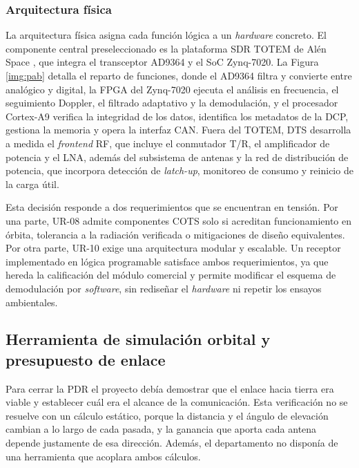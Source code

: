 
\subsubsection{Arquitectura física}

La arquitectura física asigna cada función lógica a un \textit{hardware} concreto. El componente central preseleccionado es la plataforma SDR TOTEM de Alén Space \parencite{alenspace}, que integra el transceptor AD9364 y el SoC Zynq-7020. La Figura \ref{img:pab} detalla el reparto de funciones, donde el AD9364 filtra y convierte entre analógico y digital, la FPGA del Zynq-7020 ejecuta el análisis en frecuencia, el seguimiento Doppler, el filtrado adaptativo y la demodulación, y el procesador Cortex-A9 verifica la integridad de los datos, identifica los metadatos de la DCP, gestiona la memoria y opera la interfaz CAN. Fuera del TOTEM, DTS desarrolla a medida el \textit{frontend} RF, que incluye el conmutador T/R, el amplificador de potencia y el LNA, además del subsistema de antenas y la red de distribución de potencia, que incorpora detección de \textit{latch-up}, monitoreo de consumo y reinicio de la carga útil.

Esta decisión responde a dos requerimientos que se encuentran en tensión. Por una parte, UR-08 admite componentes COTS solo si acreditan funcionamiento en órbita, tolerancia a la radiación verificada o mitigaciones de diseño equivalentes. Por otra parte, UR-10 exige una arquitectura modular y escalable. Un receptor implementado en lógica programable satisface ambos requerimientos, ya que hereda la calificación del módulo comercial y permite modificar el esquema de demodulación por \textit{software}, sin rediseñar el \textit{hardware} ni repetir los ensayos ambientales.



\subsection{Herramienta de simulación orbital y presupuesto de enlace}

Para cerrar la PDR el proyecto debía demostrar que el enlace hacia tierra era viable y establecer cuál era el alcance de la comunicación. Esta verificación no se resuelve con un cálculo estático, porque la distancia y el ángulo de elevación cambian a lo largo de cada pasada, y la ganancia que aporta cada antena depende justamente de esa dirección. Además, el departamento no disponía de una herramienta que acoplara ambos cálculos.

